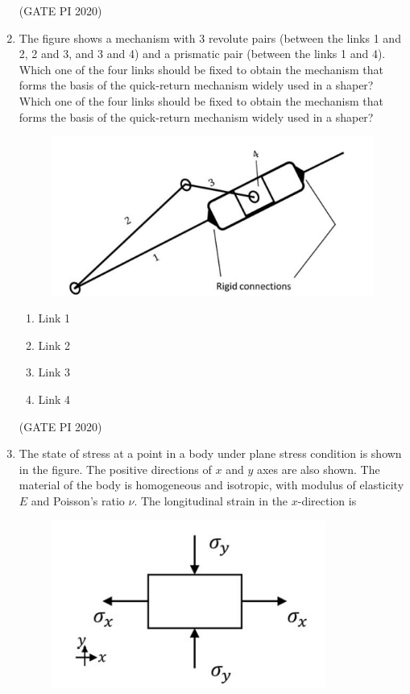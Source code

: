 \documentclass[journal,12pt,onecolumn]{IEEEtran}
\theoremstyle{remark}
\begin{document}
\begin{enumerate}
\hfill (GATE PI 2020)

\item The figure shows a mechanism with 3 revolute pairs (between the links 1 and 2, 2 and 3, and 3 and 4) and a prismatic pair (between the links 1 and 4). Which one of the four links should be fixed to obtain the mechanism that forms the basis of the quick-return mechanism widely used in a shaper? Which one of the four links should be fixed to obtain the mechanism that forms the basis of the quick-return mechanism widely used in a shaper?

\begin{figure}[h]
    \centering
    \includegraphics[width=0.5\columnwidth]{figs/fig7.png}
    \caption{}
    \label{fig:placeholder}
\end{figure}

\begin{enumerate}
    \item Link 1
    \item Link 2
    \item Link 3
    \item Link 4
\end{enumerate}

\hfill (GATE PI 2020)

\item The state of stress at a point in a body under plane stress condition is shown in the figure. The positive directions of $x$ and $y$ axes are also shown. The material of the body is homogeneous and isotropic, with modulus of elasticity $E$ and Poisson's ratio $\nu$. The longitudinal strain in the $x$\--direction is
\begin{figure}[h]
    \centering
    \includegraphics[width=0.5\columnwidth]{figs/fig8.png}
    \caption{}
    \label{fig:placeholder}
\end{figure}


\end{enumerate}
\end{document}
